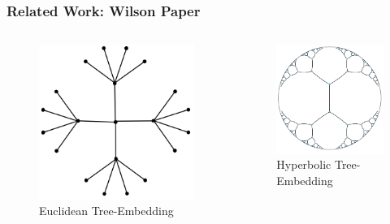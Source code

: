 \documentclass[
	11pt, %
]{beamer}
\begin{document}
\begin{frame}
	\frametitle{Related Work: Wilson Paper}

	\begin{columns}[t]
		\begin{column}{0.50\textwidth}
			\begin{figure}
				\includegraphics[width=0.8\linewidth]{euclidean-tree.png}
				\caption{Euclidean Tree-Embedding}
			\end{figure}
		\end{column}

		\begin{column}{0.50\textwidth}
			\begin{figure}
				\includegraphics[width=0.8\linewidth]{hyperbolic-tree.png}
				\caption{Hyperbolic Tree-Embedding}
			\end{figure}
		\end{column}
	\end{columns}

\end{frame}
\end{document}
